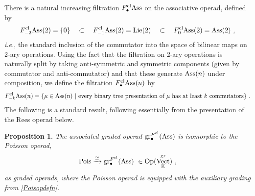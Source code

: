 \documentclass[11pt]{amsart}
\numberwithin{equation}{section}
\newtheorem{prop}[theo]{Proposition}
\theoremstyle{definition}
\newcommand{\bb}{\mathbb}
\newcommand{\Rees}{{\textup{Rees}}}
\newcommand{\OEnd}{{\textup{End}}}
\DeclareMathOperator{\Hom}{Hom}
\DeclareMathOperator{\Vect}{Vect}
\newcommand{\K}{{\bb K}}
\newcommand{\ik}{{\bb K}}
\newcommand{\Pois}{{\textup{Pois}}}
\newcommand{\Lie}{{\textup{Lie}}}
\newcommand{\Op}{{\textup{Op}}}
\newcommand{\Ass}{{\textup{Ass}}}
\newcommand{\0}{{\textbf{0}}}
\newcommand{\cl}{{\text{cl}}}
\newcommand{\gr}{\textup{gr}}
\def \Op{\mathrm{Op}}
\def \ie{{\it i.e.}}
\begin{document}
%
%
%

\subsubsection{}\label{clfiltsec} 
There is a natural increasing filtration $F_\bullet^\cl\Ass$ on the associative operad, defined by
\[ 
F_{-2}^\cl \Ass(2) = \{0\} \quad\subset\quad F_{-1}^\cl\Ass(2) =\Lie(2)  \quad\subset\quad F_0^\cl\Ass(2) = \Ass(2)~,
\]
\ie, the standard inclusion of the commutator into the space of bilinear maps on 2-ary operations. Using the fact that the filtration on 2-ary operations is naturally split by taking anti-symmetric and symmetric components (given by commutator and anti-commutator) and that these generate $\Ass(n)$ under composition, we define the filtration $F^\cl_\bullet\Ass(n)$ by
\[  
F^\cl_{-k}\Ass(n) = \{ \mu \in \Ass(n) \ | \ \text{every binary tree presentation of $\mu$ has at least $k$ commutators}\} \ . 
\]
The following is a standard result, following essentially from the presentation of the Rees operad below.
\begin{prop}\label{finclfiltprop} The associated graded operad $\gr_\bullet^{F^\cl}(\Ass)$ is isomorphic to the Poisson operad,
	\[  
	\Pois \xrightarrow{\cong } \gr_\bullet^{F^\cl}(\Ass) \ \in\Op(\Vect_\K^\gr)~,
	\]
	as graded operads, where the Poisson operad is equipped with the auxiliary grading from \ref{Poisopdefn}.
\end{prop}
\end{document}
